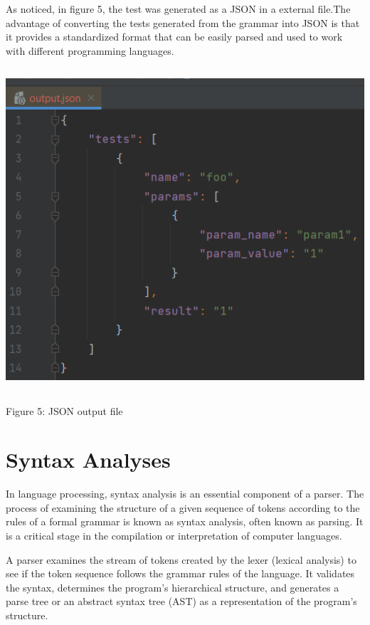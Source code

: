 As noticed, in figure 5, the test was generated as a JSON in a external file.The advantage of converting the tests generated from the grammar into JSON is that it provides a standardized format that can be easily parsed and used to work with different programming languages.

{ \centering \includegraphics[width=\textwidth, height=12cm]{images/output.png} }
\begin{center} Figure 5: JSON output file  \end{center}

\section{Syntax Analyses}
In language processing, syntax analysis is an essential component of a parser. The process of examining the structure of a given sequence of tokens according to the rules of a formal grammar is known as syntax analysis, often known as parsing. It is a critical stage in the compilation or interpretation of computer languages.

A parser examines the stream of tokens created by the lexer (lexical analysis) to see if the token sequence follows the grammar rules of the language. It validates the syntax, determines the program's hierarchical structure, and generates a parse tree or an abstract syntax tree (AST) as a representation of the program's structure.

